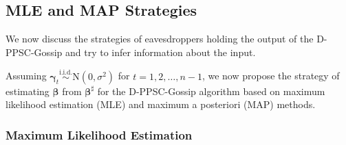 \documentclass[a4paper, 11pt]{article}
\newcommand{\1}{\mathbf{1}}
\newcommand{\normdist}{\mathrm{N}}
\newcommand{\gammab}{{\bm \gamma}}
\newcommand{\betab}{\bm{\beta}}
\begin{document}
\subsection{MLE and MAP Strategies}
We now discuss the strategies of eavesdroppers holding the output of the D-PPSC-Gossip and try to infer information about the input. 
{Assuming $\gammab_t\overset{\text{i.i.d.}}{\sim} \normdist(0, \sigma^2)$ for $t=1,2,\dots,n-1 $, we now propose the strategy of estimating $\betab$ from $\betab^\sharp$ for the D-PPSC-Gossip algorithm based on maximum likelihood estimation (MLE) and maximum a posteriori (MAP) methods.
	
	
	
	
	
	
	\subsubsection{Maximum Likelihood Estimation}
	
}
\end{document}
